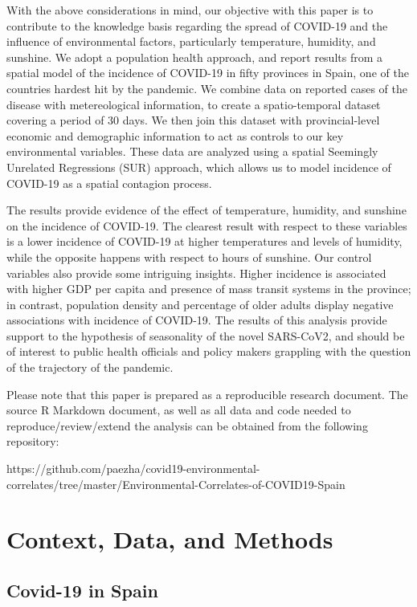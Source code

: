 \documentclass[]{elsarticle} %
\begin{document}
With the above considerations in mind, our objective with this paper is
to contribute to the knowledge basis regarding the spread of COVID-19
and the influence of environmental factors, particularly temperature,
humidity, and sunshine. We adopt a population health approach, and
report results from a spatial model of the incidence of COVID-19 in
fifty provinces in Spain, one of the countries hardest hit by the
pandemic. We combine data on reported cases of the disease with
metereological information, to create a spatio-temporal dataset covering
a period of 30 days. We then join this dataset with provincial-level
economic and demographic information to act as controls to our key
environmental variables. These data are analyzed using a spatial
Seemingly Unrelated Regressions (SUR) approach, which allows us to model
incidence of COVID-19 as a spatial contagion process.

The results provide evidence of the effect of temperature, humidity, and
sunshine on the incidence of COVID-19. The clearest result with respect
to these variables is a lower incidence of COVID-19 at higher
temperatures and levels of humidity, while the opposite happens with
respect to hours of sunshine. Our control variables also provide some
intriguing insights. Higher incidence is associated with higher GDP per
capita and presence of mass transit systems in the province; in
contrast, population density and percentage of older adults display
negative associations with incidence of COVID-19. The results of this
analysis provide support to the hypothesis of seasonality of the novel
SARS-CoV2, and should be of interest to public health officials and
policy makers grappling with the question of the trajectory of the
pandemic.

Please note that this paper is prepared as a reproducible research
document. The source R Markdown document, as well as all data and code
needed to reproduce/review/extend the analysis can be obtained from the
following repository:

https://github.com/paezha/covid19-environmental-correlates/tree/master/Environmental-Correlates-of-COVID19-Spain

\hypertarget{context-data-and-methods}{%
\section{Context, Data, and Methods}\label{context-data-and-methods}}

\hypertarget{covid-19-in-spain}{%
\subsection{Covid-19 in Spain}\label{covid-19-in-spain}}
\end{document}
